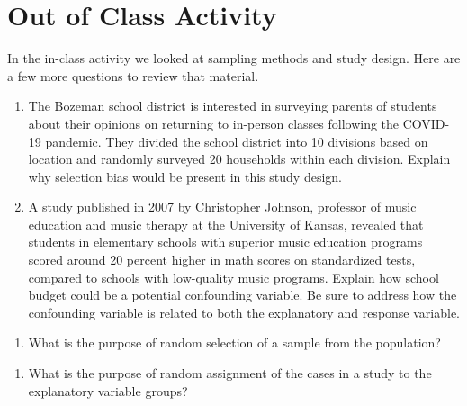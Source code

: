 \documentclass[
]{report}
\providecommand{\tightlist}{%
  \setlength{\itemsep}{0pt}\setlength{\parskip}{0pt}}
\begin{document}
\hypertarget{out-of-class-activity}{%
\section{Out of Class Activity}\label{out-of-class-activity}}

In the in-class activity we looked at sampling methods and study design. Here are a few more questions to review that material.

\begin{enumerate}
\def\labelenumi{\arabic{enumi}.}
\item
  The Bozeman school district is interested in surveying parents of students about their opinions on returning to in-person classes following the COVID-19 pandemic. They divided the school district into 10 divisions based on location and randomly surveyed 20 households within each division. Explain why selection bias would be present in this study design.
  \vspace{1in}
\item
  A study published in 2007 by Christopher Johnson, professor of music education and music therapy at the University of Kansas, revealed that students in elementary schools with superior music education programs scored around 20 percent higher in math scores on standardized tests, compared to schools with low-quality music programs. Explain how school budget could be a potential confounding variable. Be sure to address how the confounding variable is related to both the explanatory and response variable.
\end{enumerate}

\vspace{1in}

\begin{enumerate}
\def\labelenumi{\arabic{enumi}.}
\setcounter{enumi}{2}
\tightlist
\item
  What is the purpose of random selection of a sample from the population?
\end{enumerate}

\vspace{1in}

\begin{enumerate}
\def\labelenumi{\arabic{enumi}.}
\setcounter{enumi}{3}
\tightlist
\item
  What is the purpose of random assignment of the cases in a study to the explanatory variable groups?
\end{enumerate}

\vspace{1in}
\end{document}
